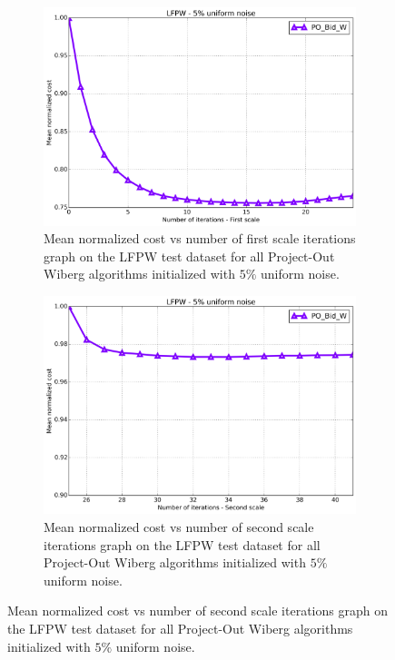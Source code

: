 \begin{figure}[p]
\begin{subfigure}{0.48\textwidth}
	\end{subfigure}
	\par\bigskip\bigskip
	\begin{subfigure}{0.48\textwidth}
	    \includegraphics[width=\textwidth]{experiments/algorithms/po_w/mean_cost_vs_iters1_po_w_5.png}
	    \caption{Mean normalized cost vs number of first scale iterations graph on the LFPW test dataset for all Project-Out Wiberg algorithms initialized with $5\%$ uniform noise.}
	    \label{fig:mean_cost_vs_iters1_po_w_5}
	\end{subfigure}
	\hfill
	\begin{subfigure}{0.48\textwidth}
	    \includegraphics[width=\textwidth]{experiments/algorithms/po_w/mean_cost_vs_iters2_po_w_5.png}
	    \caption{Mean normalized cost vs number of second scale iterations graph on the LFPW test dataset for all Project-Out Wiberg algorithms initialized with $5\%$ uniform noise.}

\end{subfigure}
\end{figure}
